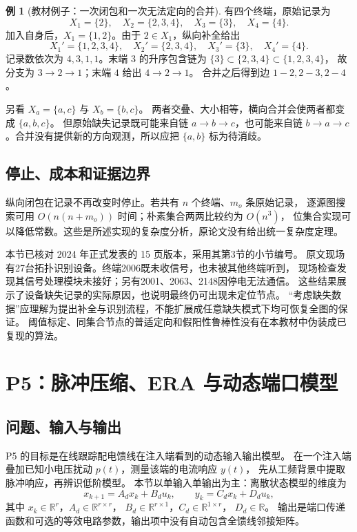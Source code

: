 \documentclass[UTF8,11pt,fontset=fandol,openany,oneside]{ctexbook}
\theoremstyle{definition}
\newtheorem{example}[theorem]{例}
\theoremstyle{remark}
\numberwithin{equation}{chapter}
\begin{document}
\begin{example}[教材例子：一次闭包和一次无法定向的合并]
有四个终端，原始记录为
\[
 X_1=\{2\},\quad X_2=\{2,3,4\},\quad X_3=\{3\},\quad X_4=\{4\}.
\]
加入自身后，$X_1=\{1,2\}$。由于 $2\in X_1$，纵向补全给出
\[
 X_1'=\{1,2,3,4\},\quad X_2'=\{2,3,4\},\quad
 X_3'=\{3\},\quad X_4'=\{4\}.
\]
记录数依次为 $4,3,1,1$。末端 $3$ 的升序包含链为
$\{3\}\subset\{2,3,4\}\subset\{1,2,3,4\}$，
故分支为 $3\to2\to1$；末端 $4$ 给出 $4\to2\to1$。
合并之后得到边 $1\!-\!2,2\!-\!3,2\!-\!4$。

另看 $X_a=\{a,c\}$ 与 $X_b=\{b,c\}$。
两者交叠、大小相等，横向合并会使两者都变成 $\{a,b,c\}$。
但原始缺失记录既可能来自链 $a\to b\to c$，也可能来自链
$b\to a\to c$。合并没有提供新的方向观测，所以应把 $\{a,b\}$ 标为待消歧。
\end{example}

\subsection{停止、成本和证据边界}
纵向闭包在记录不再改变时停止。若共有 $n$ 个终端、$m_o$ 条原始记录，
逐源图搜索可用 $O(n(n+m_o))$ 时间；朴素集合两两比较约为 $O(n^3)$，
位集合实现可以降低常数。这些是所述实现的复杂度分析，原论文没有给出统一复杂度定理。

本节已核对 2024 年正式发表的 15 页版本，采用其第3节的小节编号。
原文现场有27台拓扑识别设备。终端2006既未收信号，也未被其他终端听到，
现场检查发现其信号处理模块未接好；另有2001、2063、2148因停电无法通信。
这些结果展示了设备缺失记录的实际原因，也说明最终仍可出现未定位节点。
“考虑缺失数据”应理解为提出补全与识别流程，不能扩展成任意缺失模式下均可恢复全图的保证。
阈值标定、同集合节点的普适定向和假阳性鲁棒性没有在本教材中伪装成已复现的算法。

\section{P5：脉冲压缩、ERA 与动态端口模型}\label{sec:tb-P5}

\subsection{问题、输入与输出}
P5 的目标是在线跟踪配电馈线在注入端看到的动态输入输出模型。\citep{P5}
在一个注入端叠加已知小电压扰动 $p(t)$，测量该端的电流响应 $y(t)$，
先从工频背景中提取脉冲响应，再辨识低阶模型。
本节以单输入单输出为主：离散状态模型的维度为
\[
 x_{k+1}=A_dx_k+B_du_k,\qquad y_k=C_dx_k+D_du_k,
\]
其中 $x_k\in\mathbb R^r$，$A_d\in\mathbb R^{r\times r}$，
$B_d\in\mathbb R^{r\times1}$，$C_d\in\mathbb R^{1\times r}$，
$D_d\in\mathbb R$。
输出是端口传递函数和可选的等效电路参数，输出项中没有自动包含全馈线邻接矩阵。
\end{document}
